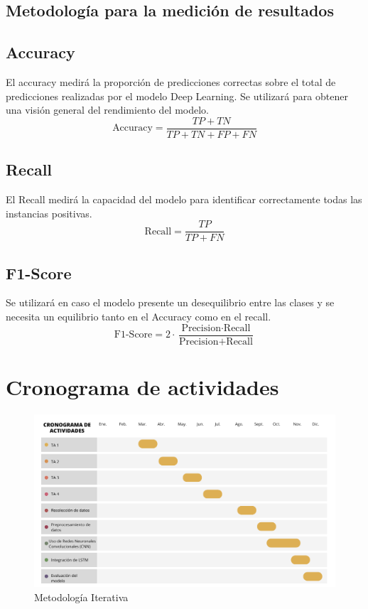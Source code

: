 \subsection{Metodología para la medición de resultados}

\subsection*{Accuracy}
El accuracy medirá la proporción de predicciones correctas sobre el total de predicciones realizadas por el modelo Deep Learning. Se utilizará para obtener una visión general del rendimiento del modelo.
\begin{equation}
	\text{Accuracy} = \frac{TP + TN}{TP + TN + FP + FN}
\end{equation}

\subsection*{Recall}
El Recall medirá la capacidad del modelo para identificar correctamente todas las instancias positivas.
\begin{equation}
	\text{Recall} = \frac{TP}{TP + FN}
\end{equation}

\subsection*{F1-Score}
Se utilizará en caso el modelo presente un desequilibrio entre las clases y se necesita un equilibrio tanto en el Accuracy como en el recall.
\begin{equation}
	\text{F1-Score} = 2 \cdot \frac{\text{Precision} \cdot \text{Recall}}{\text{Precision} + \text{Recall}}
\end{equation}


\section{Cronograma de actividades}
\begin{figure}[h!]
	\centering
	\includegraphics[width=1\textwidth]{3/figures/Actividades.png}
	\caption{Metodología Iterativa}
	\label{fig:etiqueta_de_la_figura}
\end{figure}

